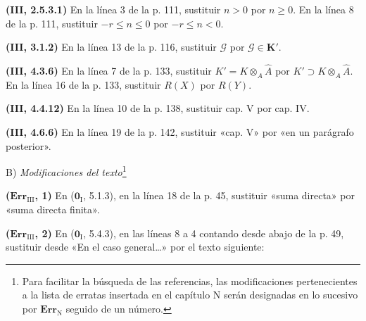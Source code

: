 \documentclass[10pt,oneside]{book}
\providecommand{\setmin}{-}%
\begin{document}
\noindent\textbf{(III, 2.5.3.1)} En la línea 3 de la p. 111, sustituir $n>0$
por $n\geq0$. En la línea 8 de la p. 111, sustituir $\setmin r\leq n\leq0$ por
$\setmin r\leq n<0$.

\noindent\textbf{(III, 3.1.2)} En la línea 13 de la p. 116, sustituir
$\mathscr G$ por $\mathscr G\in\boldsymbol{K}'$.

\noindent\textbf{(III, 4.3.6)} En la línea 7 de la p. 133, sustituir
$K'=K\otimes_A\widehat A$ por $K'\supset K\otimes_A\widehat A$. En la línea 16
de la p. 133, sustituir $R(X)$ por $R(Y)$.

\noindent\textbf{(III, 4.4.12)} En la línea 10 de la p. 138, sustituir cap. V
por cap. IV.

\noindent\textbf{(III, 4.6.6)} En la línea 19 de la p. 142, sustituir «cap. V»
por «en un parágrafo posterior».

\begin{center}
B) \emph{Modificaciones del texto}\footnote{Para facilitar la búsqueda de las
referencias, las modificaciones pertenecientes a la lista de erratas insertada
en el capítulo N serán designadas en lo sucesivo por $\mathbf{Err}_{\mathrm N}$
seguido de un número.}
\end{center}

\noindent\textbf{($\mathbf{Err}_{\mathrm{III}}$, 1)} En
($\mathbf 0_{\mathrm I}$, 5.1.3), en la línea 18 de la p. 45, sustituir «suma directa»
por «suma directa finita».

\noindent\textbf{($\mathbf{Err}_{\mathrm{III}}$, 2)} En
($\mathbf 0_{\mathrm I}$, 5.4.3), en las líneas 8 a 4 contando desde abajo de la p. 49,
sustituir desde «En el caso general\ldots{}» por el texto siguiente:
\end{document}
